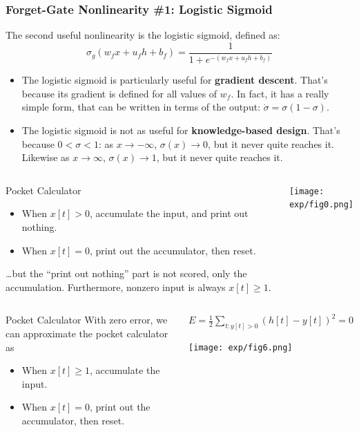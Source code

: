\documentclass{beamer}
\begin{document}
\begin{frame}
  \frametitle{Forget-Gate Nonlinearity \#1: Logistic Sigmoid}

  The second useful nonlinearity is the logistic sigmoid, defined as:
  \[
  \sigma_g(w_fx+u_fh+b_f) = \frac{1}{1+e^{-(w_fx+u_fh+b_f)}}
  \]
  \begin{itemize}
  \item The logistic sigmoid is particularly useful for {\bf gradient
    descent}.  That's because its gradient is defined for all values
    of $w_f$.  In fact, it has a really simple form, that can be
    written in terms of the output: $\dot\sigma=\sigma(1-\sigma)$.
  \item The logistic sigmoid is not as useful for {\bf knowledge-based
    design}.  That's because $0<\sigma<1$: as $x\rightarrow -\infty$,
    $\sigma(x)\rightarrow 0$, but it never quite reaches it.  Likewise
    as $x\rightarrow\infty$, $\sigma(x)\rightarrow 1$, but it never
    quite reaches it.
  \end{itemize}
\end{frame}
\begin{frame}
  \begin{columns}
    \column{2in}
    \begin{block}{Pocket Calculator}
      \begin{itemize}
        \item When $x[t]>0$, accumulate the input, and print out
          nothing.
        \item When $x[t]=0$, print out the accumulator, then reset.
      \end{itemize}
      \ldots but the ``print out nothing'' part is not scored, only
      the accumulation.  Furthermore, nonzero input is always $x[t]\ge
      1$.
    \end{block}
    \column{2.5in}
    \begin{block}{}
      \centerline{\texttt{[image: exp/fig0.png]}}
    \end{block}
    \end{columns}
\end{frame}
\begin{frame}
  \begin{columns}
    \column{2in}
    \begin{block}{Pocket Calculator}
      With zero error, we can approximate the pocket calculator as
      \begin{itemize}
        \item When $x[t]\ge 1$, accumulate the input.
        \item When $x[t]=0$, print out the accumulator, then reset.
      \end{itemize}
    \end{block}
    \column{2.5in}
    \begin{block}{$E=\frac{1}{2}\sum_{t:y[t]>0} \left(h[t]-y[t]\right)^2=0$}
      \centerline{\texttt{[image: exp/fig6.png]}}
    \end{block}
    \end{columns}
\end{frame}
\end{document}
